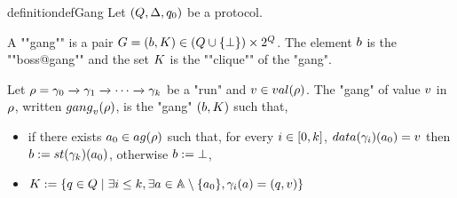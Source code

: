 \begin{restatable}{definition}{defGang}
	Let $(Q,\Delta, q_0)$ be a protocol.
	
	A ""gang"" is a pair $\gang = (\boss, \clique) \in (Q \cup \set{\noboss}) \times \powerset{Q}$. The element $\boss$ is the ""boss@gang"" and the set $\clique$ is the ""clique"" of the "gang". %
	
	Let $\rho = \gamma_0 \xrightarrow{} \gamma_1 \xrightarrow{} \cdots \xrightarrow{} \gamma_k$ be a "run" and $\aval \in \valsof{\run}$. The "gang" of value $v$ in $\rho$, written $\gangof{\aval}{\run}$, is the "gang" $(\boss, \clique)$ such that, 
	\begin{itemize}
		\item if there exists $a_0 \in \agentsof{\run}$ such that, 
		for every 
		$i \in [0,k]$, 
		$\data{\config_i}(a_0) = \aval$ then $\boss := \st{\config_k}(a_0)$, otherwise $\boss := \noboss$, 
		\item  $\clique := \set{q \in Q \mid \exists i \leq k, \exists a \in \agents\setminus \set{a_0}, \config_i(a) = (q,\aval)}$ %
	\end{itemize}
\end{restatable} 




%
%	
%		

%

